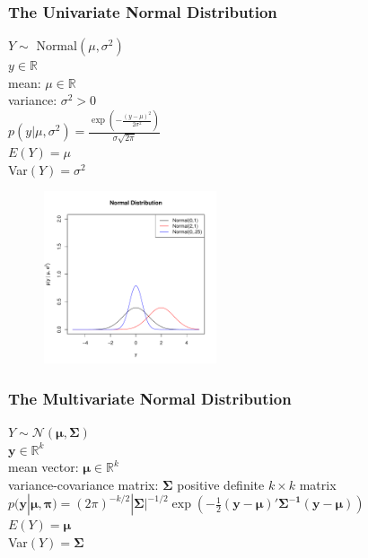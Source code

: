 \documentclass{beamer}
\begin{document}
\begin{frame}
\frametitle{The Univariate Normal Distribution}
\begin{multicols}{2}
\pause
$Y \sim$ Normal$(\mu, \sigma^2)$\\
\bigskip
\pause
$y \in \mathbb{R}$\\
\bigskip
\pause
mean: $\mu \in \mathbb{R}$\\
\pause
variance: $\sigma^2 > 0$\\
\bigskip
\pause
$p(y|\mu, \sigma^2) = \frac{\exp \left( {-\frac{(y - \mu)^2}{2\sigma^2} } \right)}{\sigma \sqrt{2 \pi}}$\\
\bigskip
\bigskip
\pause
$E(Y) = \mu$\\
\bigskip
\pause
Var$(Y) = \sigma^2$
\pause


\begin{figure}[!htp]
\begin{center}
\includegraphics[width=2in, height=2in]{probability-normal.pdf}
\end{center}
\end{figure}
\end{multicols}
\end{frame}



\begin{frame}
\frametitle{The Multivariate Normal Distribution}
\pause
$Y \sim \mathcal{N}(\bm{\mu},\bm{\Sigma})$\\
\bigskip
\pause
$\mathbf{y} \in \mathbb{R}^k$\\
\bigskip
\pause
mean vector: $\bm{\mu} \in \mathbb{R}^k$\\
\pause
variance-covariance matrix: $\bm{\Sigma}$ positive definite $k \times
k$ matrix\\
\bigskip
\pause
$p(\mathbf{y}|\bm{\mu},\bm{\pi}) = (2\pi)^{-k/2} | \bm{\Sigma}
|^{-1/2} \exp{\left( -\frac{1}{2} (\bm{y} - \bm{\mu})'
\bm{\Sigma^{-1}} (\bm{y} - \bm{\mu}) \right)}$\\
\bigskip
\bigskip
\pause
$E(Y) = \bm{\mu}$\\
\bigskip
\pause
Var$(Y) = \bm{\Sigma}$\\
\end{frame}
\end{document}
